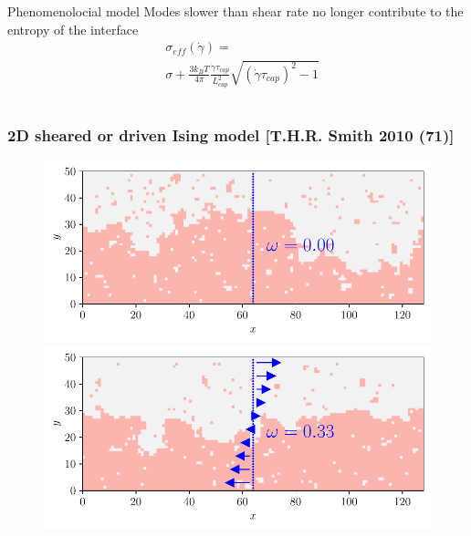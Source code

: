 \documentclass[9pt, dvipsnames]{beamer} %
\newcommand{\nn}{\nonumber \\} %
\begin{document}
\begin{frame}
\begin{overprint}
\begin{columns}
	    \begin{block}{Phenomenolocial model}
	    Modes slower than shear rate  no longer contribute to the entropy of the interface
			\begin{align}
			&\sigma_{eff}(\dot{\gamma}) = \nn
			&\sigma + \frac{3 k_B T}{4 \pi} \frac{\dot{\gamma} \tau_{cap}}{L^2_{cap}} \sqrt{(\dot{\gamma}\tau_{cap})^2-1}
			\end{align}
		\end{block}
	    \end{columns}	
	\end{overprint}
\end{frame}

\begin{frame}
    \frametitle{2D sheared or driven Ising model [T.H.R. Smith 2010 (71)]}
    \begin{overprint} 
    	\begin{figure}
		\begin{minipage}[t]{0.5\linewidth}
		\includegraphics[width=\linewidth]{cis-ising-f-000.pdf}
		\end{minipage}%
		\begin{minipage}[t]{0.5\linewidth}
		\includegraphics[width=\linewidth]{cis-ising-f-033.pdf}
		\end{minipage}

\end{figure}
\end{overprint}
\end{frame}
\end{document}

